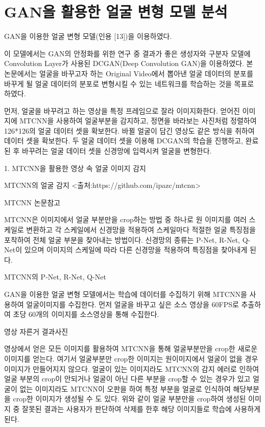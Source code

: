 \documentclass{oblivoir}
\begin{document}
\section{ GAN을 활용한 얼굴 변형 모델 분석}

GAN을 이용한 얼굴 변형 모델(인용 [13])을 이용하였다.

이 모델에서는 GAN의 안정화를 위한 연구 중 결과가 좋은 생성자와 구분자 모델에 Convolution Layer가 사용된 DCGAN(Deep Convolution GAN)을 이용하였다. 본 논문에서는 얼굴을 바꾸고자 하는 Original Video에서 뽑아낸 얼굴 데이터의 분포를 바꾸게 될 얼굴 데이터의 분포로 변형시킬 수 있는 네트워크를 학습하는 것을 목표로 하였다.

먼저, 얼굴을 바꾸려고 하는 영상을 특정 프레임으로 잘라 이미지화한다. 얻어진 이미지에 MTCNN을 사용하여 얼굴부분을 감지하고,  정면을 바라보는 사진처럼 정렬하여 126*126의 얼굴 데이터 셋을 확보한다. 바뀔 얼굴이 담긴 영상도 같은 방식을 취하여 데이터 셋을 확보한다. 두 얼굴 데이터 셋을 이용해 DCGAN의 학습을 진행하고, 완료된 후 바꾸려는 얼굴 데이터 셋을 신경망에 입력시켜 얼굴을 변형한다.

1. MTCNN을 활용한 영상 속 얼굴 이미지 감지

MTCNN의 얼굴 감지 <출처:https://github.com/ipazc/mtcnn>

MTCNN 논문참고

MTCNN은 이미지에서 얼굴 부분만을 crop하는 방법 중 하나로 원 이미지를 여러 스케일로 변환하고 각 스케일에서 신경망을 적용하여 스케일마다 적절한 얼굴 특징점을 포착하여 전체 얼굴 부분을 찾아내는 방법이다. 신경망의 종류는 P-Net, R-Net, Q-Net이 있으며 이미지의 스케일에 따라 다른 신경망을 적용하여 특징점을 찾아내게 된다.

MTCNN의 P-Net, R-Net, Q-Net

GAN을 이용한 얼굴 변형 모델에서는 학습에 데이터를 수집하기 위해 MTCNN을 사용하여 얼굴이미지를 수집한다. 먼저 얼굴을 바꾸고 싶은 소스 영상을 60FPS로 추출하여 초당 60개의 이미지를 소스영상을 통해 수집한다.

영상 자른거 결과사진

영상에서 얻은 모든 이미지를 활용하여 MTCNN을 통해 얼굴부분만을 crop한 새로운 이미지를 얻는다. 여기서 얼굴부분만 crop한 이미지는 원이미지에서 얼굴이 없을 경우 이미지가 만들어지지 않으다. 얼굴이 있는 이미지라도 MTCNN의 감지 에러로 인하여 얼굴 부분의 crop이 안되거나 얼굴이 아닌 다른 부분을 crop할 수 있는 경우가 있고 얼굴이 없는 이미지라도 MTCNN이 오판을 하여 특정 부분을 얼굴로 인식하여 해당부분을 crop한 이미지가 생성될 수 도 있다. 위와 같이 얼굴 부분만을 crop하여 생성된 이미지 중 잘못된 결과는 사용자가 판단하여 삭제를 한후 해당 이미지들로 학습에 사용하게 된다.
\end{document}
